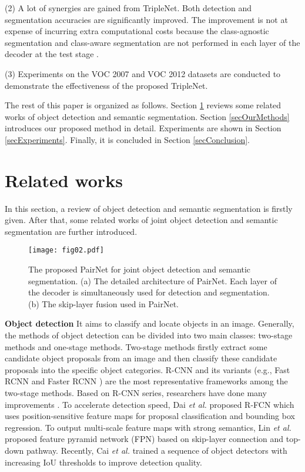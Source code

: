 \documentclass[10pt,twocolumn,letterpaper]{article}
\begin{document}
(2) A lot of synergies are gained from TripleNet. Both detection and segmentation accuracies are significantly improved. The improvement is not at expense of incurring extra computational costs because the class-agnostic segmentation and class-aware segmentation are not performed in each layer of the decoder at the test stage .  


(3)	Experiments on the VOC 2007 and VOC 2012 datasets are conducted to demonstrate the effectiveness of the proposed TripleNet. 

The rest of this paper is organized as follows. Section \ref{secRelatedWork} reviews some related works of object detection and semantic segmentation. Section \ref{secOurMethods} introduces our proposed method in detail. Experiments are shown in Section \ref{secExperiments}. Finally, it is concluded in Section \ref{secConclusion}.

\section{Related works}
\label{secRelatedWork}
In this section, a review of object detection and semantic segmentation is firstly given. After that, some related works of joint object detection and semantic segmentation are further introduced.

\begin{figure*}[ht]
\begin{center}
\texttt{[image: fig02.pdf]}
\end{center}
\caption{The proposed PairNet for joint object detection and semantic segmentation. (a) The detailed architecture of PairNet. Each layer of the decoder is simultaneously used for detection and segmentation. (b) The skip-layer fusion used in PairNet.}
\label{fig02}
\end{figure*}
\textbf{Object detection} It aims to classify and locate objects in an image. Generally, the methods of object detection can be divided into two main classes: two-stage methods and one-stage methods. Two-stage methods firstly extract some candidate object proposals from an image and then classify these candidate proposals into the specific object categories. R-CNN \cite{Girshick_RCNN_CVPR_2014} and its variants (e.g., Fast RCNN \cite{Girshick_FastRCNN_ICCV_2015} and Faster RCNN \cite{Ren_FasterRCNN_NIPS_2015}) are the most representative frameworks among the two-stage methods. Based on R-CNN series, researchers have done many improvements \cite{Dai_RFCN_NIPS_2016,Lin_FPN_CVPR_2017,Cai_Cascade_CVPR_2018}. To accelerate detection speed, Dai \textit{et al.} \cite{Dai_RFCN_NIPS_2016} proposed R-FCN which uses position-sensitive feature maps for proposal classification and bounding box regression. To output multi-scale feature maps with strong semantics, Lin \textit{et al.} \cite{Lin_FPN_CVPR_2017} proposed feature pyramid network (FPN) based on skip-layer connection and top-down pathway. Recently, Cai \textit{et al.} \cite{Cai_Cascade_CVPR_2018} trained a sequence of object detectors with increasing IoU thresholds to improve detection quality.
\end{document}
